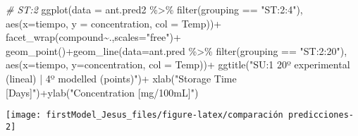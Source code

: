 \documentclass[
]{article}
\newenvironment{Shaded}{\begin{snugshade}}{\end{snugshade}}
\newcommand{\AttributeTok}[1]{\textcolor[rgb]{0.77,0.63,0.00}{#1}}
\newcommand{\CommentTok}[1]{\textcolor[rgb]{0.56,0.35,0.01}{\textit{#1}}}
\newcommand{\FunctionTok}[1]{\textcolor[rgb]{0.00,0.00,0.00}{#1}}
\newcommand{\NormalTok}[1]{#1}
\newcommand{\SpecialCharTok}[1]{\textcolor[rgb]{0.00,0.00,0.00}{#1}}
\newcommand{\StringTok}[1]{\textcolor[rgb]{0.31,0.60,0.02}{#1}}
\begin{document}
\begin{Shaded}
\begin{Highlighting}[]
\CommentTok{\# ST:2}
\FunctionTok{ggplot}\NormalTok{(}\AttributeTok{data =}\NormalTok{ ant.pred2 }\SpecialCharTok{\%\textgreater{}\%} \FunctionTok{filter}\NormalTok{(grouping }\SpecialCharTok{==} \StringTok{"ST:2:4"}\NormalTok{), }\FunctionTok{aes}\NormalTok{(}\AttributeTok{x=}\NormalTok{tiempo, }\AttributeTok{y =}\NormalTok{ concentration, }\AttributeTok{col =}\NormalTok{ Temp))}\SpecialCharTok{+}
  \FunctionTok{facet\_wrap}\NormalTok{(compound}\SpecialCharTok{\textasciitilde{}}\NormalTok{.,}\AttributeTok{scales=}\StringTok{"free"}\NormalTok{)}\SpecialCharTok{+}
  \FunctionTok{geom\_point}\NormalTok{()}\SpecialCharTok{+}\FunctionTok{geom\_line}\NormalTok{(}\AttributeTok{data=}\NormalTok{ant.pred }\SpecialCharTok{\%\textgreater{}\%} \FunctionTok{filter}\NormalTok{(grouping }\SpecialCharTok{==} \StringTok{"ST:2:20"}\NormalTok{), }\FunctionTok{aes}\NormalTok{(}\AttributeTok{x=}\NormalTok{tiempo, }\AttributeTok{y=}\NormalTok{concentration, }\AttributeTok{col =}\NormalTok{ Temp))}\SpecialCharTok{+}
  \FunctionTok{ggtitle}\NormalTok{(}\StringTok{"SU:1 20º experimental (lineal) | 4º modelled (points)"}\NormalTok{)}\SpecialCharTok{+} \FunctionTok{xlab}\NormalTok{(}\StringTok{"Storage Time [Days]"}\NormalTok{)}\SpecialCharTok{+}\FunctionTok{ylab}\NormalTok{(}\StringTok{"Concentration [mg/100mL]"}\NormalTok{)}
\end{Highlighting}
\end{Shaded}

\begin{center}\texttt{[image: firstModel\_Jesus\_files/figure-latex/comparación predicciones-2]} \end{center}
\end{document}
